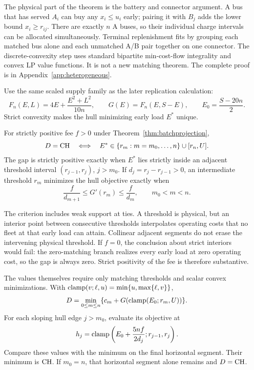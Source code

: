 The physical part of the theorem is the battery and connector argument.
A bus that has served $A_i$ can buy any $x_i\le u_i$ early; pairing it
with $B_j$ adds the lower bound $x_i\ge r_{ij}$. There are exactly $n$
A buses, so their individual charge intervals can be allocated simultaneously.
Terminal replenishment fits by grouping each matched bus alone and each
unmatched A/B pair together on one connector. The discrete-convexity step
uses standard bipartite min-cost-flow integrality and convex LP value
functions. It is not a new matching theorem. The complete proof is in
Appendix~\ref{app:heterogeneous}.

Use the same scaled supply family as the later replication calculation:
\begin{equation}\label{eq:batchsupply}
 F_n(E,L)=4E+\frac{E^2+L^2}{10n},\qquad
 G(E)=F_n(E,S-E),\qquad E_0=\frac{S-20n}{2}.
\end{equation}
Strict convexity makes the hull minimizing early load $E^*$ unique.

\begin{theorem}
\label{thm:batchsupport}
For strictly positive fee $f>0$ under Theorem~\ref{thm:batchprojection},
\begin{equation}\label{eq:batchzero}
 D=\mathrm{CH}\quad\Longleftrightarrow\quad
 E^*\in\{r_m:m=m_0,\ldots,n\}\cup[r_n,U].
\end{equation}
The gap is strictly positive exactly when $E^*$ lies strictly inside an
adjacent threshold interval $(r_{j-1},r_j)$, $j>m_0$.
If $d_j=r_j-r_{j-1}>0$, an intermediate threshold $r_m$ minimizes the
hull objective exactly when
\begin{equation}\label{eq:batchvertex}
 \frac{f}{d_{m+1}}\le G'(r_m)\le\frac{f}{d_m},
 \qquad m_0<m<n.
\end{equation}
\end{theorem}

The criterion includes weak support at ties. A threshold is physical, but
an interior point between consecutive thresholds interpolates operating
costs that no fleet at that early load can attain. Collinear adjacent
segments do not erase the intervening physical threshold. If $f=0$,
the conclusion about strict interiors would fail: the zero-matching
branch realizes every early load at zero operating cost, so the gap is
always zero. Strict positivity of the fee is therefore substantive.

The values themselves require only matching thresholds and scalar convex
minimizations. With $\operatorname{clamp}(v;\ell,u)=\min\{u,\max\{\ell,v\}\}$,
\begin{equation}\label{eq:batchD}
 D=\min_{0\le m\le n}\{c_m+G(\operatorname{clamp}(E_0;r_m,U))\}.
\end{equation}
For each sloping hull edge $j>m_0$, evaluate its objective at
\begin{equation}\label{eq:batchh}
 h_j=\operatorname{clamp}\left(E_0+\frac{5nf}{2d_j};r_{j-1},r_j\right).
\end{equation}
Compare these values with the minimum on the final horizontal segment.
Their minimum is $\mathrm{CH}$. If $m_0=n$, that horizontal segment alone
remains and $D=\mathrm{CH}$.


